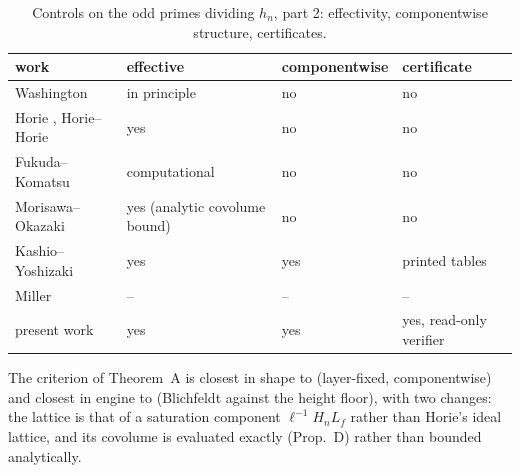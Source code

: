 \documentclass[11pt]{amsart}
\theoremstyle{remark}\newtheorem{remark}[theorem]{Remark}
\theoremstyle{definition}\newtheorem{definition}[theorem]{Definition}
\theoremstyle{definition}\newtheorem{algorithm}[theorem]{Algorithm}
\begin{document}
\begin{table}[h]\footnotesize
\begin{tabular}{@{}p{3.0cm}p{3.4cm}p{2.2cm}p{2.6cm}@{}}\toprule
work & effective & componentwise & certificate\\ \midrule
Washington \cite{Wa75,Wa78} & in principle & no & no\\
Horie \cite{Ho05,Ho07}, Horie--Horie \cite{HH09} & yes & no & no\\
Fukuda--Komatsu \cite{FK3} & computational & no & no\\
Morisawa--Okazaki \cite{MO16} & yes (analytic covolume bound) & no & no\\
Kashio--Yoshizaki \cite{KY} & yes & yes & printed tables\\
Miller \cite{Mi} & -- & -- & --\\
present work & yes & yes & yes, read-only verifier\\
\bottomrule\end{tabular}
\caption{Controls on the odd primes dividing $h_n$, part 2: effectivity, componentwise structure, certificates.}\label{tab:compb}
\end{table}

The criterion of Theorem~A is closest in shape to \cite{KY} (layer-fixed, componentwise) and closest in engine to \cite{MO16} (Blichfeldt against the height floor), with two changes: the lattice is that of a saturation component $\ell^{-1}H_nL_f$ rather than Horie's ideal lattice, and its covolume is evaluated exactly (Prop.~D) rather than bounded analytically.
\end{document}
